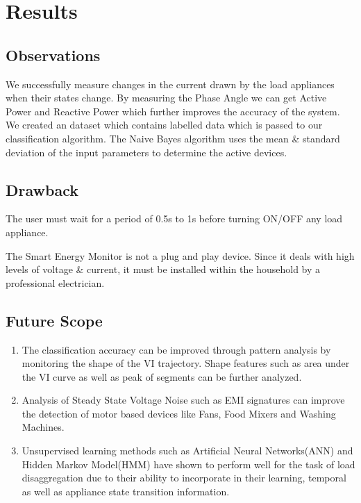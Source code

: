 \chapter{Results}
\section{Observations}
{
We successfully measure changes in the current drawn by the load appliances when their states change. By measuring the Phase Angle we can get Active Power and Reactive Power which further improves the accuracy of the system. We created an dataset which contains labelled data which is passed to our classification algorithm. The Naive Bayes algorithm uses the mean & standard deviation of the input parameters to determine the active devices.  }

\section{Drawback }
The user must wait for a period of 0.5s to 1s before turning ON/OFF any load appliance.  

The Smart Energy Monitor is not a plug and play device. Since it deals with high levels of voltage & current, it must be installed within the household by a professional electrician.

\section{Future Scope}
\begin{enumerate}
    \item The classification accuracy can be improved through pattern analysis by monitoring the shape of the VI trajectory. Shape features such as area under the VI curve as well as peak of segments can be further analyzed.
    \item Analysis of Steady  State Voltage Noise such as EMI signatures can improve the detection of motor based devices like Fans, Food Mixers and Washing Machines.
    \item Unsupervised learning methods such as Artificial Neural Networks(ANN) and Hidden Markov Model(HMM) have shown to perform well for the task of load disaggregation due to their ability to incorporate in their learning, temporal as well as appliance state transition information.
\end{enumerate}